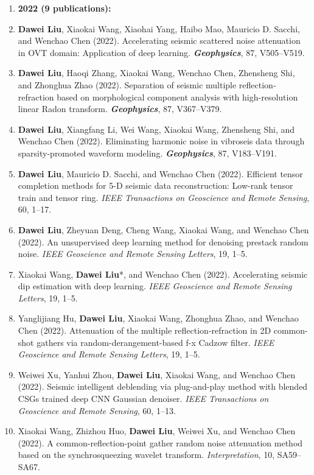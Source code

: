 \documentclass[11pt,a4paper]{article}
\begin{document}
\begin{enumerate}[leftmargin=1.5em, itemsep=0pt, topsep=2pt]
    \item[] \hspace{-25pt} \textbf{2022 (9 publications):}
    \item \textbf{Dawei Liu}, Xiaokai Wang, Xiaohai Yang, Haibo Mao, Mauricio D. Sacchi, and Wenchao Chen (2022). Accelerating seismic scattered noise attenuation in OVT domain: Application of deep learning. {\bf \em Geophysics}, 87, V505--V519.
    \item \textbf{Dawei Liu}, Haoqi Zhang, Xiaokai Wang, Wenchao Chen, Zhensheng Shi, and Zhonghua Zhao (2022). Separation of seismic multiple reflection-refraction based on morphological component analysis with high-resolution linear Radon transform. {\bf \em Geophysics}, 87, V367--V379.
    \item \textbf{Dawei Liu}, Xiangfang Li, Wei Wang, Xiaokai Wang, Zhensheng Shi, and Wenchao Chen (2022). Eliminating harmonic noise in vibroseis data through sparsity-promoted waveform modeling. {\bf \em Geophysics}, 87, V183--V191.
    \item \textbf{Dawei Liu}, Mauricio D. Sacchi, and Wenchao Chen (2022). Efficient tensor completion methods for 5-D seismic data reconstruction: Low-rank tensor train and tensor ring. {\em IEEE Transactions on Geoscience and Remote Sensing}, 60, 1--17.
    \item \textbf{Dawei Liu}, Zheyuan Deng, Cheng Wang, Xiaokai Wang, and Wenchao Chen (2022). An unsupervised deep learning method for denoising prestack random noise. {\em IEEE Geoscience and Remote Sensing Letters}, 19, 1--5.
    \item Xiaokai Wang, \textbf{Dawei Liu}*, and Wenchao Chen (2022). Accelerating seismic dip estimation with deep learning. {\em IEEE Geoscience and Remote Sensing Letters}, 19, 1--5.
    \item Yanglijiang Hu, \textbf{Dawei Liu}, Xiaokai Wang, Zhonghua Zhao, and Wenchao Chen (2022). Attenuation of the multiple reflection-refraction in 2D common-shot gathers via random-derangement-based f-x Cadzow filter. {\em IEEE Geoscience and Remote Sensing Letters}, 19, 1--5.
    \item Weiwei Xu, Yanhui Zhou, \textbf{Dawei Liu}, Xiaokai Wang, and Wenchao Chen (2022). Seismic intelligent deblending via plug-and-play method with blended CSGs trained deep CNN Gaussian denoiser. {\em IEEE Transactions on Geoscience and Remote Sensing}, 60, 1--13.
    \item Xiaokai Wang, Zhizhou Huo, \textbf{Dawei Liu}, Weiwei Xu, and Wenchao Chen (2022). A common-reflection-point gather random noise attenuation method based on the synchrosqueezing wavelet transform. {\em Interpretation}, 10, SA59--SA67.
    

\end{enumerate}
\end{document}
